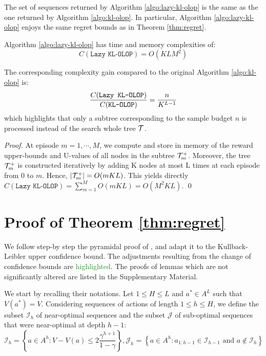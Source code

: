 \documentclass[runningheads]{llncs}
\newcommand{\citep}{\cite}
\newcommand{\diff}[1]{\textcolor{ForestGreen}{#1}}
\begin{document}
\begin{theorem}[Consistency]
\label{thm:consistency}
The set of sequences returned by Algorithm \ref{algo:lazy-kl-olop} is the same as the one returned by Algorithm \ref{algo:kl-olop}.
In particular, Algorithm \ref{algo:lazy-kl-olop} enjoys the same regret bounds as in Theorem \ref{thm:regret}.
\end{theorem}

\begin{property}
Algorithm \ref{algo:lazy-kl-olop} has time and memory complexities of:
\begin{equation*}
    C(\texttt{Lazy KL-OLOP}) = O(KLM^2)
\end{equation*}

The corresponding complexity gain compared to the original Algorithm \ref{algo:kl-olop} is: 
\begin{equation*}
    \frac{C(\texttt{Lazy KL-OLOP})}{C(\texttt{KL-OLOP})} = \frac{n}{K^{L-1}}
\end{equation*}
which highlights that only a subtree corresponding to the sample budget $n$ is processed instead of the search whole tree $\mathcal{T}$.
\end{property}
\begin{proof}
At episode $m = 1, \cdots, M$, we compute and store in memory of the reward upper-bounds and U-values of all nodes in the subtree $\mathcal{T}_m^+$. Moreover, the tree $\mathcal{T}_m^+$ is constructed iteratively by adding K nodes at most L times at each episode from 0 to $m$. Hence, $|\mathcal{T}_m^+| = O(mKL)$.
This yields directly $C(\texttt{Lazy KL-OLOP}) = \sum_{m=1}^M O(mKL) = O(M^2KL)$.
\qed
\end{proof}

\section{Proof of Theorem \ref{thm:regret}}
\label{sec:regret-proof}


We follow step-by step the pyramidal proof of \citep{Bubeck2010}, and adapt it to the Kullback-Leibler upper confidence bound. The adjustments resulting from the change of confidence bounds are \diff{highlighted}. The proofs of lemmas which are not significantly altered are listed in the Supplementary Material. 

We start by recalling their notations.
Let $1 \leq H \leq L$ and $a^* \in A^L$ such that $V(a^*) = V$.
Considering sequences of actions of length $1 \leq h \leq H$, we define the subset $\mathcal{I}_h$ of near-optimal sequences and the subset $\mathcal{J}$ of sub-optimal sequences that were near-optimal at depth $h-1$:
\begin{equation*}
    \mathcal{I}_h = \left\{a \in A^h: V - V(a) \leq 2\frac{\gamma^{h+1}}{1-\gamma}\right\}, \mathcal{J}_h = \left\{a \in A^h: a_{1:h-1} \in \mathcal{I}_{h-1} \text{ and } a \not\in \mathcal{I}_h\right\}
\end{equation*}
\end{document}
